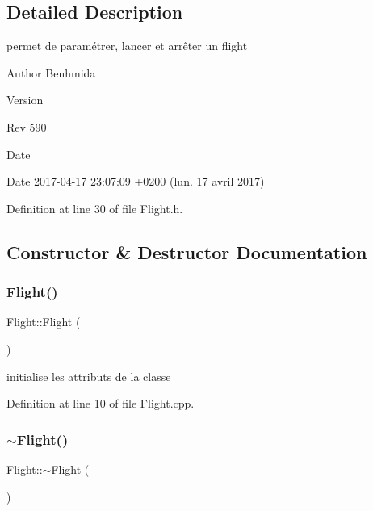 \subsection{Detailed Description}
permet de paramétrer, lancer et arrêter un flight 

\begin{DoxyAuthor}{Author}
Benhmida 
\end{DoxyAuthor}
\begin{DoxyVersion}{Version}

\end{DoxyVersion}
\begin{DoxyParagraph}{Rev}
590 
\end{DoxyParagraph}
\begin{DoxyDate}{Date}

\end{DoxyDate}
\begin{DoxyParagraph}{Date}
2017-\/04-\/17 23\+:07\+:09 +0200 (lun. 17 avril 2017) 
\end{DoxyParagraph}


Definition at line 30 of file Flight.\+h.



\subsection{Constructor \& Destructor Documentation}
\mbox{\label{class_flight_acbf1e8c321e01e04db2fe651a08b30af}} 
\subsubsection{\texorpdfstring{Flight()}{Flight()}}
{\footnotesize\ttfamily Flight\+::\+Flight (\begin{DoxyParamCaption}{ }\end{DoxyParamCaption})}



initialise les attributs de la classe 



Definition at line 10 of file Flight.\+cpp.

\mbox{\label{class_flight_a6e9898949b83cfbc068b4d5820990782}} 
\subsubsection{\texorpdfstring{$\sim$\+Flight()}{~Flight()}}
{\footnotesize\ttfamily Flight\+::$\sim$\+Flight (\begin{DoxyParamCaption}{ }\end{DoxyParamCaption})\hspace{0.3cm}{\ttfamily [inline]}}



